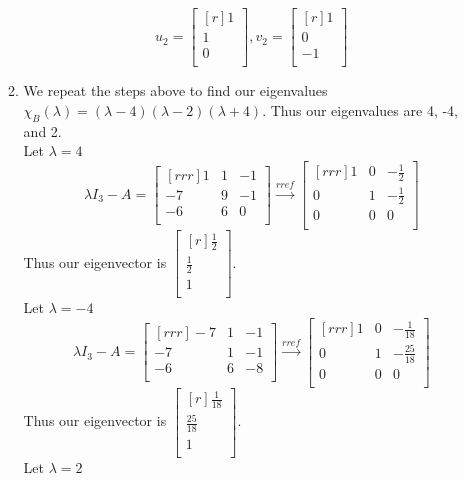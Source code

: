\documentclass[12pt]{article}
\theoremstyle{definition}
\theoremstyle{plain}
\begin{document}
\begin{enumerate}
\begin{enumerate}
	\[ u_{2} = \begin{bmatrix}[r]1\\1\\0\\\end{bmatrix}, v_2=\begin{bmatrix}[r]1\\0\\-1\\\end{bmatrix} \]
	\item We repeat the steps above to find our eigenvalues $\chi_B(\lambda)=(\lambda-4)(\lambda-2)(\lambda+4)$. Thus our eigenvalues are 4, -4, and 2.\\
	Let $\lambda=4$
	\[ \lambda I_3-A = \begin{bmatrix}[rrr]1&1&-1\\-7&9&-1\\-6&6&0\\\end{bmatrix} \xrightarrow[]{rref} \begin{bmatrix}[rrr]1&0&-\frac{1}{2}\\0&1&-\frac{1}{2}\\0&0&0\\\end{bmatrix} \]
	Thus our eigenvector is $\begin{bmatrix}[r]\frac{1}{2}\\\frac{1}{2}\\1\\\end{bmatrix}$.\\
	Let $\lambda=-4$
	\[ \lambda I_3-A = \begin{bmatrix}[rrr]-7&1&-1\\-7&1&-1\\-6&6&-8\\\end{bmatrix} \xrightarrow[]{rref} \begin{bmatrix}[rrr]1&0&-\frac{1}{18}\\0&1&-\frac{25}{18}\\0&0&0\\\end{bmatrix} \]
	Thus our eigenvector is $\begin{bmatrix}[r]\frac{1}{18}\\\frac{25}{18}\\1\\\end{bmatrix}$.\\
	Let $\lambda=2$

\end{enumerate}
\end{enumerate}
\end{document}
